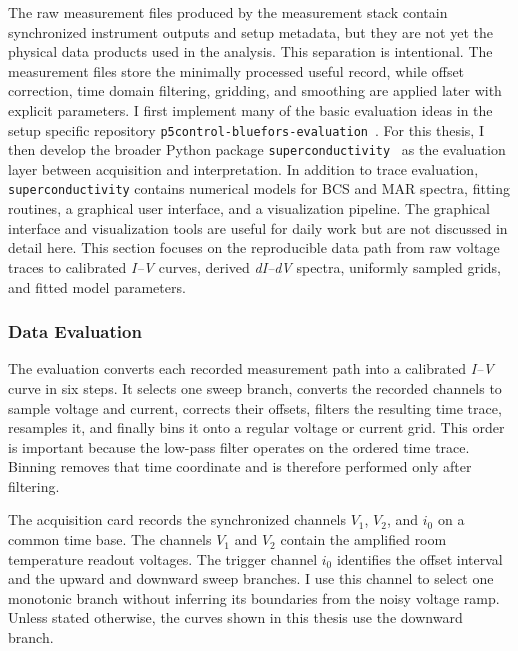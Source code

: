         The raw measurement files produced by the measurement stack contain synchronized instrument outputs and setup metadata, but they are not yet the physical data products used in the analysis. This separation is intentional. The measurement files store the minimally processed useful record, while offset correction, time domain filtering, gridding, and smoothing are applied later with explicit parameters. I first implement many of the basic evaluation ideas in the setup specific repository \texttt{p5control-bluefors-evaluation}~\cite{p5control_bluefors_evaluation}. For this thesis, I then develop the broader Python package \texttt{superconductivity}~\cite{aschenbrenner_superconductivity} as the evaluation layer between acquisition and interpretation. In addition to trace evaluation, \texttt{superconductivity} contains numerical models for BCS and MAR spectra, fitting routines, a graphical user interface, and a visualization pipeline. The graphical interface and visualization tools are useful for daily work but are not discussed in detail here. This section focuses on the reproducible data path from raw voltage traces to calibrated \textit{I--V} curves, derived \textit{dI--dV} spectra, uniformly sampled grids, and fitted model parameters.

        \subsubsection*{Data Evaluation}

            The evaluation converts each recorded measurement path into a calibrated \textit{I--V} curve in six steps. It selects one sweep branch, converts the recorded channels to sample voltage and current, corrects their offsets, filters the resulting time trace, resamples it, and finally bins it onto a regular voltage or current grid. This order is important because the low-pass filter operates on the ordered time trace. Binning removes that time coordinate and is therefore performed only after filtering.

            The acquisition card records the synchronized channels $V_1$, $V_2$, and $i_0$ on a common time base. The channels $V_1$ and $V_2$ contain the amplified room temperature readout voltages. The trigger channel $i_0$ identifies the offset interval and the upward and downward sweep branches. I use this channel to select one monotonic branch without inferring its boundaries from the noisy voltage ramp. Unless stated otherwise, the curves shown in this thesis use the downward branch.

